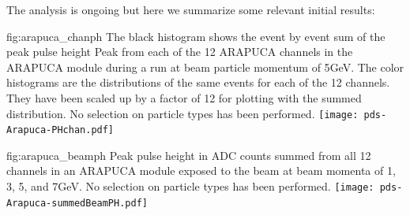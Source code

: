 The analysis is ongoing but here we summarize some relevant initial results:


\begin{dunefigure}{fig:arapuca_chanph}
{The black histogram shows the event by event sum of the peak pulse height Peak from each of the \num{12} ARAPUCA channels in the ARAPUCA module during a run at beam particle momentum of \num{5}{GeV}. The color histograms are the distributions of the same events for each of the \num{12} channels.  They have been scaled up by a factor of \num{12} for plotting with the summed distribution. No selection on particle types has been performed.}
\texttt{[image: pds-Arapuca-PHchan.pdf]}
\end{dunefigure}

\begin{dunefigure}{fig:arapuca_beamph}
{Peak pulse height in ADC counts summed from all 12 channels in an ARAPUCA module exposed to the beam at beam momenta of \num{1}, \num{3}, \num{5}, and \num{7}{GeV}. No selection on particle types has been performed.}
\texttt{[image: pds-Arapuca-summedBeamPH.pdf]}
\end{dunefigure}


